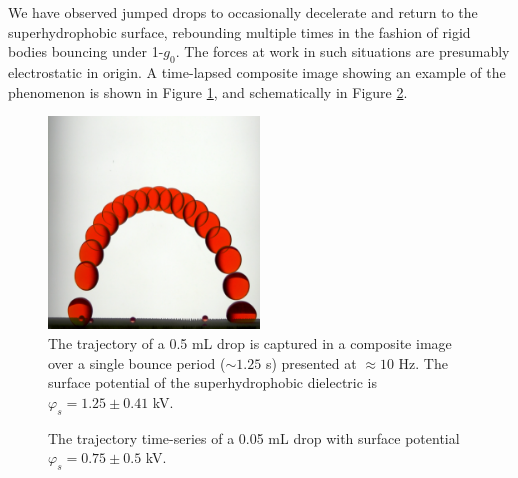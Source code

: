 \documentclass[aip,reprint, floatfix]{revtex4-1}
\begin{document}
We have observed jumped drops to occasionally decelerate and return to the superhydrophobic surface, rebounding multiple times in the fashion of rigid bodies bouncing under 1-$g_0$. The forces at work in such situations are presumably electrostatic in origin. A time-lapsed composite image showing an example of the phenomenon is shown in Figure \ref{fig:bounce}, and schematically in Figure \ref{fig:bounce_time}.
\begin{figure}[htb]
\centering
\includegraphics[width=0.5\textwidth]{bounce}
\caption{The trajectory of a 0.5 mL drop is captured in a composite image over a single bounce period ($\sim 1.25$ s) presented at $\approx 10$ Hz. The surface potential of the superhydrophobic dielectric is $\varphi_s = 1.25 \pm 0.41$ kV. \label{fig:bounce}}
\end{figure}

\begin{figure}[htb]
\centering
\resizebox{0.5\textwidth}{!}{}
\caption{The trajectory time-series of a 0.05 mL drop with surface potential $\varphi_s = 0.75 \pm 0.5$ kV. \label{fig:bounce_time}}
\end{figure}
\end{document}
